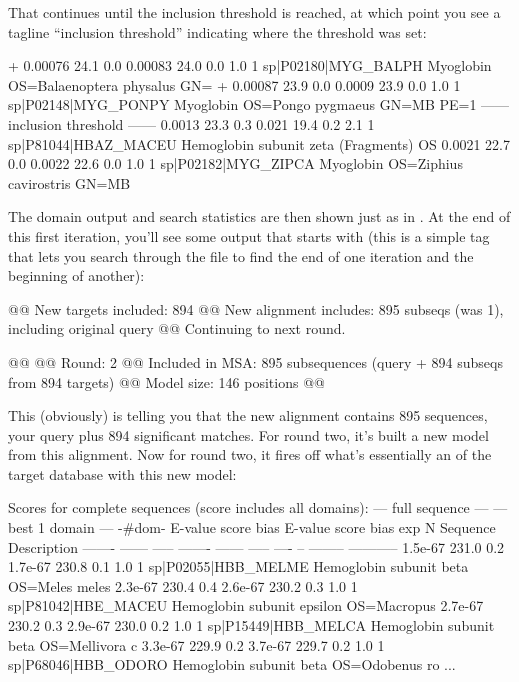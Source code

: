 That continues until the inclusion threshold is reached, at which
point you see a tagline ``inclusion threshold'' indicating where the
threshold was set:

\begin{sreoutput}
+   0.00076   24.1   0.0    0.00083   24.0   0.0    1.0  1  sp|P02180|MYG_BALPH   Myoglobin OS=Balaenoptera physalus GN=
+   0.00087   23.9   0.0     0.0009   23.9   0.0    1.0  1  sp|P02148|MYG_PONPY   Myoglobin OS=Pongo pygmaeus GN=MB PE=1
  ------ inclusion threshold ------
     0.0013   23.3   0.3      0.021   19.4   0.2    2.1  1  sp|P81044|HBAZ_MACEU  Hemoglobin subunit zeta (Fragments) OS
     0.0021   22.7   0.0     0.0022   22.6   0.0    1.0  1  sp|P02182|MYG_ZIPCA   Myoglobin OS=Ziphius cavirostris GN=MB
\end{sreoutput}

The domain output and search statistics are then shown just as in
. At the end of this first iteration, you'll see some
output that starts with  (this is a simple tag that lets you
search through the file to find the end of one iteration and the
beginning of another):

\begin{sreoutput}
@@ New targets included:   894
@@ New alignment includes: 895 subseqs (was 1), including original query
@@ Continuing to next round.

@@
@@ Round:                  2
@@ Included in MSA:        895 subsequences (query + 894 subseqs from 894 targets)
@@ Model size:             146 positions
@@
\end{sreoutput}

This (obviously) is telling you that the new alignment contains 895
sequences, your query plus 894 significant matches. For round two,
it's built a new model from this alignment. Now for round two, it
fires off what's essentially an  of the target
database with this new model:

\begin{sreoutput}
Scores for complete sequences (score includes all domains):
   --- full sequence ---   --- best 1 domain ---    -#dom-
    E-value  score  bias    E-value  score  bias    exp  N  Sequence              Description
    ------- ------ -----    ------- ------ -----   ---- --  --------              -----------
    1.5e-67  231.0   0.2    1.7e-67  230.8   0.1    1.0  1  sp|P02055|HBB_MELME   Hemoglobin subunit beta OS=Meles meles
    2.3e-67  230.4   0.4    2.6e-67  230.2   0.3    1.0  1  sp|P81042|HBE_MACEU   Hemoglobin subunit epsilon OS=Macropus
    2.7e-67  230.2   0.3    2.9e-67  230.0   0.2    1.0  1  sp|P15449|HBB_MELCA   Hemoglobin subunit beta OS=Mellivora c
    3.3e-67  229.9   0.2    3.7e-67  229.7   0.2    1.0  1  sp|P68046|HBB_ODORO   Hemoglobin subunit beta OS=Odobenus ro
...
\end{sreoutput}

